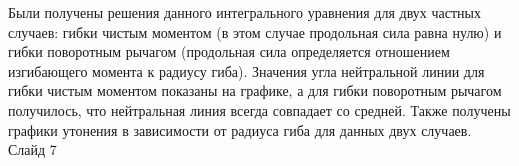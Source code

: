 Были получены решения данного интегрального уравнения для двух частных случаев: гибки чистым моментом (в этом случае продольная сила равна нулю) и гибки поворотным рычагом (продольная сила определяется отношением изгибающего момента к радиусу гиба).
Значения угла нейтральной линии для гибки чистым моментом показаны на графике, а для гибки поворотным рычагом получилось, что нейтральная линия всегда совпадает со средней. Также получены графики утонения в зависимости от радиуса гиба для данных двух случаев.
Слайд 7

